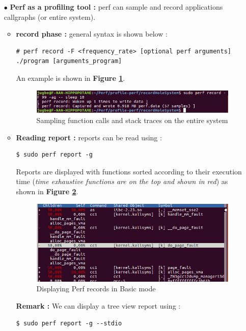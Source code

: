 \begin{itemize}
\begin{enumerate}
		\end{enumerate}

	\item[$\bullet$] \textbf{Perf as a profiling tool : } perf can sample and record  applications callgraphs (or entire system).
	
	\begin{itemize}
		\item \textbf{record phase : } general syntax is shown below :
	\begin{lstlisting}[style=BashInputStyle]
# perf record -F <frequency_rate> [optional perf arguments] ./program [arguments_program]
	\end{lstlisting}	
	
	
An example is shown in \textbf{Figure \ref{Sampling function calls and stack traces on  the entire system}}.	
					\begin{figure}[H]
						\centering
        				\includegraphics[scale=0.4]{img/solution/record-hole-system-perf.png}
        				\caption{Sampling function calls and stack traces on  the entire system}
        				\label{Sampling function calls and stack traces on  the entire system}
    				\end{figure}
    				
    				
    	\item \textbf{Reading report : } reports can be read using :
 	\begin{lstlisting}[style=BashInputStyle]   	
    	$ sudo perf report -g	
    \end{lstlisting}	
Reports are displayed with functions sorted according to their execution time
(\textit{time exhaustive functions are on the top and shown in red})  as shown in \textbf{Figure \ref{Displaying Perf records in Basic mode}}.			
					\begin{figure}[H]
						\centering
        				\includegraphics[scale=0.4]{img/solution/basic-display-record-mode-perf.png}
        				\caption{Displaying Perf records in Basic mode}
        				\label{Displaying Perf records in Basic mode}
    				\end{figure}
 \textbf{Remark : } We can display a tree view report using : 
 	\begin{lstlisting}[style=BashInputStyle]   	
    	$ sudo perf report -g --stdio 
    \end{lstlisting} 
   				

\end{itemize}
\end{itemize}
